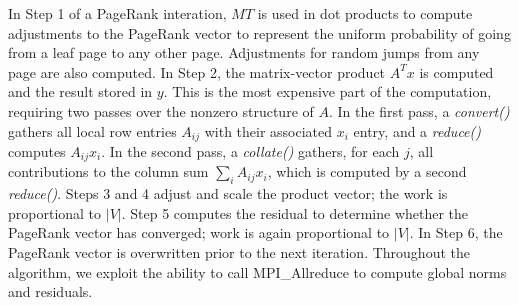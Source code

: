In Step 1 of a PageRank interation, $MT$ is used in dot products to
compute adjustments to the PageRank vector to represent the uniform
probability of going from a leaf page to any other page.  Adjustments
for random jumps from any page are also computed.  In Step 2, the
matrix-vector product $A^T x$ is computed and the result stored in
$y$.  This is the most expensive part of the computation, requiring
two passes over the nonzero structure of $A$.  In the first pass, a
{\it convert()} gathers all local row entries $A_{ij}$ with their
associated $x_i$ entry, and a {\it reduce()} computes $A_{ij} x_i$.
In the second pass, a {\it collate()} gathers, for each $j$, all
contributions to the column sum $\sum_i A_{ij} x_i$, which is computed
by a second {\it reduce()}.  Steps 3 and 4 adjust and scale the
product vector; the work is proportional to $|V|$.  Step 5 computes
the residual to determine whether the PageRank vector has converged;
work is again proportional to $|V|$.  In Step 6, the PageRank vector
is overwritten prior to the next iteration.  Throughout the algorithm,
we exploit the ability to call MPI\_Allreduce to compute global norms
and residuals.

